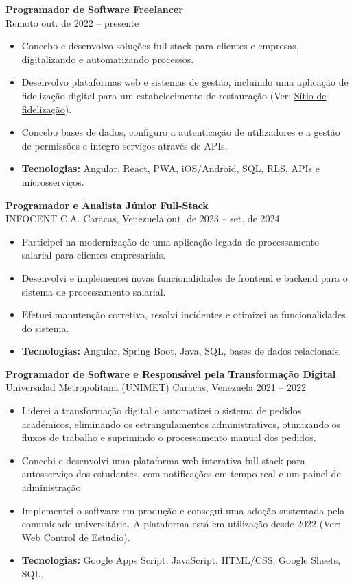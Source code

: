\documentclass[10pt,a4paper]{article}
\begin{document}
\textbf{\large Programador de Software Freelancer}\\
{\color{muted}Remoto \textbar{} out. de 2022 -- presente}
\begin{itemize}
    \item Concebo e desenvolvo soluções full-stack para clientes e empresas, digitalizando e automatizando processos.
    \item Desenvolvo plataformas web e sistemas de gestão, incluindo uma aplicação de fidelização digital para um estabelecimento de restauração (Ver: \href{https://avenidakebab.com/}{Sítio de fidelização}).
    \item Concebo bases de dados, configuro a autenticação de utilizadores e a gestão de permissões e integro serviços através de APIs.
    \item \textbf{Tecnologias:} Angular, React, PWA, iOS/Android, SQL, RLS, APIs e microsserviços.
\end{itemize}

\textbf{\large Programador e Analista Júnior Full-Stack}\\
{\color{muted}INFOCENT C.A. \textbar{} Caracas, Venezuela \textbar{} out. de 2023 -- set. de 2024}
\begin{itemize}
    \item Participei na modernização de uma aplicação legada de processamento salarial para clientes empresariais.
    \item Desenvolvi e implementei novas funcionalidades de frontend e backend para o sistema de processamento salarial.
    \item Efetuei manutenção corretiva, resolvi incidentes e otimizei as funcionalidades do sistema.
    \item \textbf{Tecnologias:} Angular, Spring Boot, Java, SQL, bases de dados relacionais.
\end{itemize}

\textbf{\large Programador de Software e Responsável pela Transformação Digital}\\
{\color{muted}Universidad Metropolitana (UNIMET) \textbar{} Caracas, Venezuela \textbar{} 2021 -- 2022}
\begin{itemize}
    \item Liderei a transformação digital e automatizei o sistema de pedidos académicos, eliminando os estrangulamentos administrativos, otimizando os fluxos de trabalho e suprimindo o processamento manual dos pedidos.
    \item Concebi e desenvolvi uma plataforma web interativa full-stack para autosserviço dos estudantes, com notificações em tempo real e um painel de administração.
    \item Implementei o software em produção e consegui uma adoção sustentada pela comunidade universitária. A plataforma está em utilização desde 2022 (Ver: \href{https://script.google.com/macros/s/AKfycbw3h26r_mjt0jow79RT9dnPaUKZ81dVUsF8qDeEjp7wsRg-ldqHjlB9L0FJYP_Uc_LXUw/exec}{Web Control de Estudio}).
    \item \textbf{Tecnologias:} Google Apps Script, JavaScript, HTML/CSS, Google Sheets, SQL.
\end{itemize}
\end{document}
